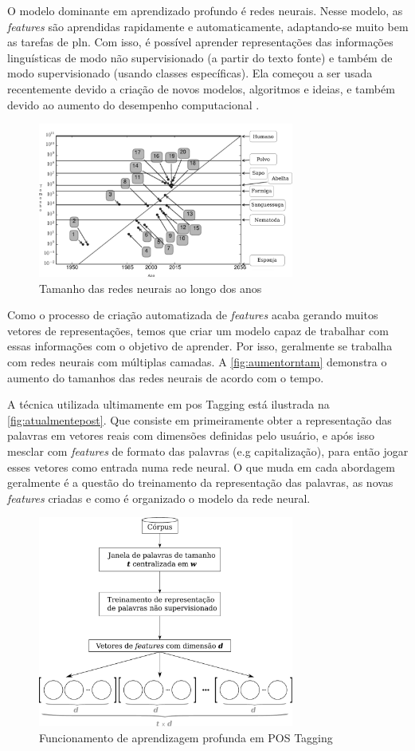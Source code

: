O modelo dominante em aprendizado profundo é redes neurais. Nesse modelo, as \textit{features} são aprendidas rapidamente e automaticamente, adaptando-se muito bem as tarefas de \ac{pln}. Com isso, é possível aprender representações das informações linguísticas de modo não supervisionado (a partir do texto fonte) e também de modo supervisionado (usando classes específicas). Ela começou a ser usada recentemente devido a criação de novos modelos, algoritmos e ideias, e também devido ao aumento do desempenho computacional \cite{deeplearningfornlp}.

\begin{figure}
\centering
\caption{Tamanho das redes neurais ao longo dos anos} \label{fig:aumentorntam}
\includegraphics[width=0.75\textwidth]{img/aumentorntam.pdf}
\end{figure}

Como o processo de criação automatizada de \textit{features} acaba gerando muitos vetores de representações, temos que criar um modelo capaz de trabalhar com essas informações com o objetivo de aprender. Por isso, geralmente se trabalha com redes neurais com múltiplas camadas. A \autoref{fig:aumentorntam} demonstra o aumento do tamanhos das redes neurais de acordo com o tempo. 

A técnica utilizada ultimamente em \ac{pos} Tagging está ilustrada na \autoref{fig:atualmentepost}. Que consiste em primeiramente obter a representação das palavras em vetores reais com dimensões definidas pelo usuário, e após isso mesclar com \textit{features} de formato das palavras (e.g capitalização), para então jogar esses vetores como entrada numa rede neural. O que muda em cada abordagem geralmente é a questão do treinamento da representação das palavras, as novas \textit{features} criadas e como é organizado o modelo da rede neural.

\begin{figure}
\centering
\caption{Funcionamento de aprendizagem profunda em POS Tagging} \label{fig:atualmentepost}
\includegraphics[width=0.75\textwidth]{img/deeplearningfunc}
\end{figure}

